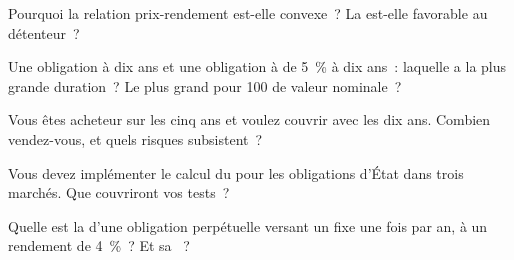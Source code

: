 \begin{interviewq}\label{iq:m2:government-bonds:2}
Pourquoi la relation prix-rendement est-elle convexe~? La  est-elle favorable au détenteur~?
\end{interviewq}

\begin{interviewq}\label{iq:m2:government-bonds:3}
Une obligation  à dix ans et une obligation à  de 5~\% à dix ans~: laquelle a la
plus grande duration~? Le plus grand  pour 100 de valeur nominale~?
\end{interviewq}

\begin{interviewq}\label{iq:m2:government-bonds:4}
Vous êtes acheteur sur les cinq ans et voulez couvrir avec les dix ans. Combien
vendez-vous, et quels risques subsistent~?
\end{interviewq}

\begin{interviewq}\label{iq:m2:government-bonds:5}
Vous devez implémenter le calcul du  pour les obligations d'État dans trois
marchés. Que couvriront vos tests~?
\end{interviewq}

\begin{interviewq}\label{iq:m2:government-bonds:6}
Quelle est la  d'une obligation perpétuelle versant un  fixe une
fois par an, à un rendement de 4~\%~? Et sa ~?
\end{interviewq}
